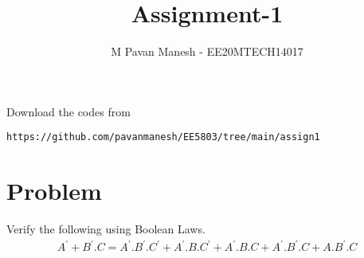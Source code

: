 \documentclass[journal,12pt]{IEEEtran}
\begin{document}
\onecolumn

\newtheorem{theorem}{Theorem}[section]
\newtheorem{problem}{Problem}
\newtheorem{proposition}{Proposition}[section]
\newtheorem{lemma}{Lemma}[section]
\newtheorem{corollary}[theorem]{Corollary}
\newtheorem{example}{Example}[section]
\newtheorem{definition}[problem]{Definition}

\newcommand{\BEQA}{\begin{eqnarray}}
\newcommand{\EEQA}{\end{eqnarray}}
\newcommand{\define}{\stackrel{\triangle}{=}}

\raggedbottom
\setlength{\parindent}{0pt}
\providecommand{\mbf}{\mathbf}
\providecommand{\pr}[1]{\ensuremath{\Pr\left(#1\right)}}
\providecommand{\qfunc}[1]{\ensuremath{Q\left(#1\right)}}
\providecommand{\sbrak}[1]{\ensuremath{{}\left[#1\right]}}
\providecommand{\lsbrak}[1]{\ensuremath{{}\left[#1\right.}}
\providecommand{\rsbrak}[1]{\ensuremath{{}\left.#1\right]}}
\providecommand{\brak}[1]{\ensuremath{\left(#1\right)}}
\providecommand{\lbrak}[1]{\ensuremath{\left(#1\right.}}
\providecommand{\rbrak}[1]{\ensuremath{\left.#1\right)}}
\providecommand{\cbrak}[1]{\ensuremath{\left\{#1\right\}}}
\providecommand{\lcbrak}[1]{\ensuremath{\left\{#1\right.}}
\providecommand{\rcbrak}[1]{\ensuremath{\left.#1\right\}}}
\theoremstyle{remark}
\newtheorem{rem}{Remark}
\providecommand{\dec}[2]{\ensuremath{\overset{#1}{\underset{#2}{\gtrless}}}}
\newcommand{\myvec}[1]{\ensuremath{\begin{pmatrix}#1\end{pmatrix}}}
\renewcommand{\thefigure}{\theproblem}
\def\putbox#1#2#3{\makebox[0in][l]{\makebox[#1][l]{}\raisebox{\baselineskip}[0in][0in]{\raisebox{#2}[0in][0in]{#3}}}}
     \def\rightbox#1{\makebox[0in][r]{#1}}
     \def\centbox#1{\makebox[0in]{#1}}
     \def\topbox#1{\raisebox{-\baselineskip}[0in][0in]{#1}}
     \def\midbox#1{\raisebox{-0.5\baselineskip}[0in][0in]{#1}}
\vspace{3cm}
\title{Assignment-1}
\author{M Pavan Manesh - EE20MTECH14017}
\maketitle
\bigskip
\renewcommand{\thefigure}{\theenumi}
\renewcommand{\thetable}{\theenumi}
%
Download the codes from 
%
\begin{lstlisting}
https://github.com/pavanmanesh/EE5803/tree/main/assign1
\end{lstlisting}
\section{\textbf{Problem}}
Verify the following using Boolean Laws.
\begin{align}
    A^{'}+B^{'}.C=A^{'}.B^{'}.C^{'}+A^{'}.B.C^{'}+A^{'}.B.C+A^{'}.B^{'}.C+A.B^{'}.C \nonumber
\end{align}
\end{document}
